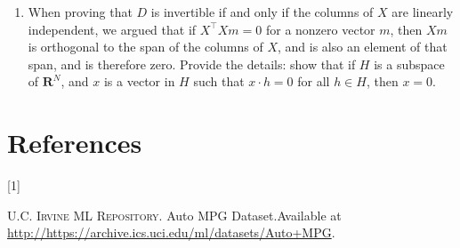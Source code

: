 \documentclass[
]{article}
\providecommand{\tightlist}{%
  \setlength{\itemsep}{0pt}\setlength{\parskip}{0pt}}
\newlength{\cslhangindent}
\newlength{\csllabelwidth}
\newlength{\cslentryspacingunit} %
\newenvironment{CSLReferences}[2] %
 {%
  \setlength{\parindent}{0pt}
  \ifodd #1
  \let\oldpar\par
  \def\par{\hangindent=\cslhangindent\oldpar}
  \fi
  \setlength{\parskip}{#2\cslentryspacingunit}
 }%
 {}
\newcommand{\CSLLeftMargin}[1]{\parbox[t]{\csllabelwidth}{#1}}
\newcommand{\CSLRightInline}[1]{\parbox[t]{\linewidth - \csllabelwidth}{#1}\break}
\begin{document}
\begin{enumerate}
\def\labelenumi{\arabic{enumi}.}
\tightlist
\item
  When proving that \(D\) is invertible if and only if the columns of
  \(X\) are linearly independent, we argued that if
  \(X^{\intercal}Xm=0\) for a nonzero vector \(m\), then \(Xm\) is
  orthogonal to the span of the columns of \(X\), and is also an element
  of that span, and is therefore zero. Provide the details: show that if
  \(H\) is a subspace of \(\mathbf{R}^{N}\), and \(x\) is a vector in
  \(H\) such that \(x\cdot h=0\) for all \(h\in H\), then \(x=0\).
\end{enumerate}

\hypertarget{bibliography}{%
\section*{References}\label{bibliography}}

\hypertarget{refs}{}
\begin{CSLReferences}{0}{0}
\leavevmode{}%
\CSLLeftMargin{{[}1{]} }
\CSLRightInline{\textsc{U.C. Irvine ML Repository}. {Auto MPG
Dataset}.Available at
\url{http://https://archive.ics.uci.edu/ml/datasets/Auto+MPG}.}

\end{CSLReferences}
\end{document}
